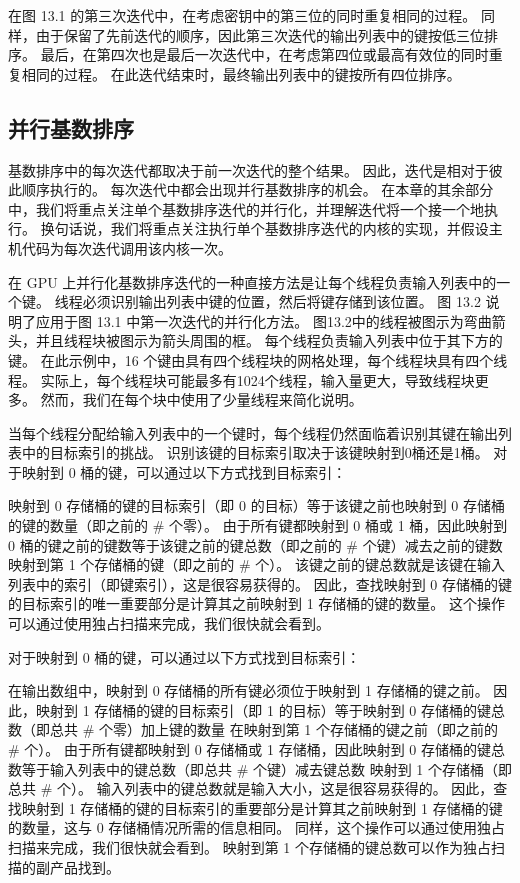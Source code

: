 在图 13.1 的第三次迭代中，在考虑密钥中的第三位的同时重复相同的过程。 同样，由于保留了先前迭代的顺序，因此第三次迭代的输出列表中的键按低三位排序。 最后，在第四次也是最后一次迭代中，在考虑第四位或最高有效位的同时重复相同的过程。 在此迭代结束时，最终输出列表中的键按所有四位排序。

\subsection{并行基数排序}
基数排序中的每次迭代都取决于前一次迭代的整个结果。 因此，迭代是相对于彼此顺序执行的。 每次迭代中都会出现并行基数排序的机会。 在本章的其余部分中，我们将重点关注单个基数排序迭代的并行化，并理解迭代将一个接一个地执行。 换句话说，我们将重点关注执行单个基数排序迭代的内核的实现，并假设主机代码为每次迭代调用该内核一次。

在 GPU 上并行化基数排序迭代的一种直接方法是让每个线程负责输入列表中的一个键。 线程必须识别输出列表中键的位置，然后将键存储到该位置。 图 13.2 说明了应用于图 13.1 中第一次迭代的并行化方法。 图13.2中的线程被图示为弯曲箭头，并且线程块被图示为箭头周围的框。 每个线程负责输入列表中位于其下方的键。 在此示例中，16 个键由具有四个线程块的网格处理，每个线程块具有四个线程。 实际上，每个线程块可能最多有1024个线程，输入量更大，导致线程块更多。 然而，我们在每个块中使用了少量线程来简化说明。

当每个线程分配给输入列表中的一个键时，每个线程仍然面临着识别其键在输出列表中的目标索引的挑战。 识别该键的目标索引取决于该键映射到0桶还是1桶。 对于映射到 0 桶的键，可以通过以下方式找到目标索引：

映射到 0 存储桶的键的目标索引（即 0 的目标）等于该键之前也映射到 0 存储桶的键的数量（即之前的 \# 个零）。 由于所有键都映射到 0 桶或 1 桶，因此映射到 0 桶的键之前的键数等于该键之前的键总数（即之前的 \# 个键）减去之前的键数 映射到第 1 个存储桶的键（即之前的 \# 个）。 该键之前的键总数就是该键在输入列表中的索引（即键索引），这是很容易获得的。 因此，查找映射到 0 存储桶的键的目标索引的唯一重要部分是计算其之前映射到 1 存储桶的键的数量。 这个操作可以通过使用独占扫描来完成，我们很快就会看到。

对于映射到 0 桶的键，可以通过以下方式找到目标索引：

在输出数组中，映射到 0 存储桶的所有键必须位于映射到 1 存储桶的键之前。 因此，映射到 1 存储桶的键的目标索引（即 1 的目标）等于映射到 0 存储桶的键总数（即总共 \# 个零）加上键的数量 在映射到第 1 个存储桶的键之前（即之前的 \# 个）。 由于所有键都映射到 0 存储桶或 1 存储桶，因此映射到 0 存储桶的键总数等于输入列表中的键总数（即总共 \# 个键）减去键总数 映射到 1 个存储桶（即总共 \# 个）。 输入列表中的键总数就是输入大小，这是很容易获得的。 因此，查找映射到 1 存储桶的键的目标索引的重要部分是计算其之前映射到 1 存储桶的键的数量，这与 0 存储桶情况所需的信息相同。 同样，这个操作可以通过使用独占扫描来完成，我们很快就会看到。 映射到第 1 个存储桶的键总数可以作为独占扫描的副产品找到。

